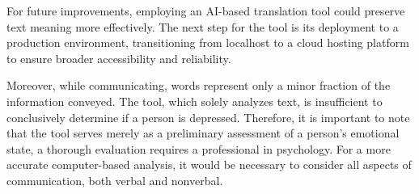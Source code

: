\documentclass[3p,times,procedia]{elsarticle}
\begin{document}
For future improvements, employing an AI-based translation tool could preserve text meaning more effectively. The next step for the tool is its deployment to a production environment, transitioning from localhost to a cloud hosting platform to ensure broader accessibility and reliability.

Moreover, while communicating, words represent only a minor fraction of the information conveyed. The tool, which solely analyzes text, is insufficient to conclusively determine if a person is depressed. Therefore, it is important to note that the tool serves merely as a preliminary assessment of a person’s emotional state, a thorough evaluation requires a professional in psychology. For a more accurate computer-based analysis, it would be necessary to consider all aspects of communication, both verbal and nonverbal.



\footnotesize{



\null


} 
\end{document}
